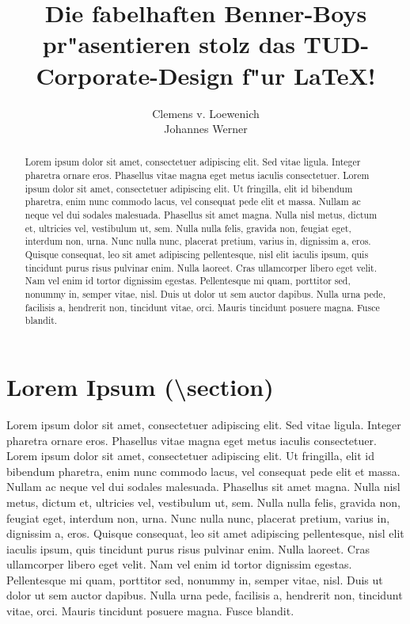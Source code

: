 \documentclass[article,colorback,accentcolor=tud4c]{tudreport}
\title{Die fabelhaften Benner-Boys pr"asentieren
  stolz das TUD-\\Corporate-Design f"ur {\LaTeX}!}
\subtitle{Clemens v. Loewenich\\Johannes Werner}
\begin{document}
\maketitle
\begin{abstract}
    Lorem ipsum dolor sit amet, consectetuer adipiscing elit. Sed vitae ligula. Integer pharetra ornare eros. Phasellus vitae magna eget metus iaculis consectetuer. Lorem ipsum dolor sit amet, consectetuer adipiscing elit. Ut fringilla, elit id bibendum pharetra, enim nunc commodo lacus, vel consequat pede elit et massa. Nullam ac neque vel dui sodales malesuada. Phasellus sit amet magna. Nulla nisl metus, dictum et, ultricies vel, vestibulum ut, sem. Nulla nulla felis, gravida non, feugiat eget, interdum non, urna. Nunc nulla nunc, placerat pretium, varius in, dignissim a, eros. Quisque consequat, leo sit amet adipiscing pellentesque, nisl elit iaculis ipsum, quis tincidunt purus risus pulvinar enim. Nulla laoreet. Cras ullamcorper libero eget velit. Nam vel enim id tortor dignissim egestas. Pellentesque mi quam, porttitor sed, nonummy in, semper vitae, nisl. Duis ut dolor ut sem auctor dapibus. Nulla urna pede, facilisis a, hendrerit non, tincidunt vitae, orci. Mauris tincidunt posuere magna. Fusce blandit.
\end{abstract}  

\tableofcontents

  \section{Lorem Ipsum (\textbackslash section)}

    Lorem ipsum dolor sit amet, consectetuer adipiscing elit. Sed vitae ligula. Integer pharetra ornare eros. Phasellus vitae magna eget metus iaculis consectetuer. Lorem ipsum dolor sit amet, consectetuer adipiscing elit. Ut fringilla, elit id bibendum pharetra, enim nunc commodo lacus, vel consequat pede elit et massa. Nullam ac neque vel dui sodales malesuada. Phasellus sit amet magna. Nulla nisl metus, dictum et, ultricies vel, vestibulum ut, sem. Nulla nulla felis, gravida non, feugiat eget, interdum non, urna. Nunc nulla nunc, placerat pretium, varius in, dignissim a, eros. Quisque consequat, leo sit amet adipiscing pellentesque, nisl elit iaculis ipsum, quis tincidunt purus risus pulvinar enim. Nulla laoreet. Cras ullamcorper libero eget velit. Nam vel enim id tortor dignissim egestas. Pellentesque mi quam, porttitor sed, nonummy in, semper vitae, nisl. Duis ut dolor ut sem auctor dapibus. Nulla urna pede, facilisis a, hendrerit non, tincidunt vitae, orci. Mauris tincidunt posuere magna. Fusce blandit.
\end{document}
